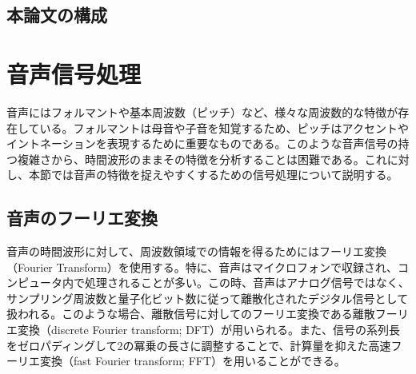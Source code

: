 \documentclass[12pt]{jarticle}
\numberwithin{equation}{section}    %
\numberwithin{figure}{section}      %
\numberwithin{table}{section}      %
\begin{document}
\subsection{本論文の構成}
\clearpage

\section{音声信号処理}
音声にはフォルマントや基本周波数（ピッチ）など、様々な周波数的な特徴が存在している。フォルマントは母音や子音を知覚するため、ピッチはアクセントやイントネーションを表現するために重要なものである。このような音声信号の持つ複雑さから、時間波形のままその特徴を分析することは困難である。これに対し、本節では音声の特徴を捉えやすくするための信号処理について説明する。

\subsection{音声のフーリエ変換}
音声の時間波形に対して、周波数領域での情報を得るためにはフーリエ変換（Fourier Transform）を使用する。特に、音声はマイクロフォンで収録され、コンピュータ内で処理されることが多い。この時、音声はアナログ信号ではなく、サンプリング周波数と量子化ビット数に従って離散化されたデジタル信号として扱われる。このような場合、離散信号に対してのフーリエ変換である離散フーリエ変換（discrete Fourier transform; DFT）が用いられる。また、信号の系列長をゼロパディングして2の冪乗の長さに調整することで、計算量を抑えた高速フーリエ変換（fast Fourier transform; FFT）を用いることができる。
\end{document}
